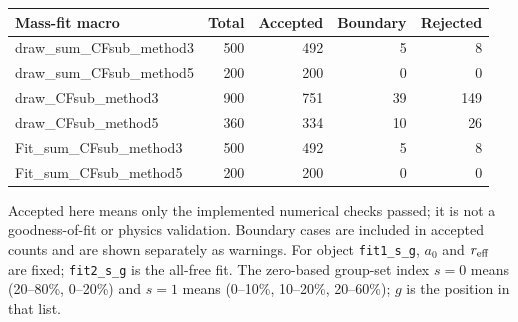 \documentclass[11pt,a4paper]{article}
\begin{document}
{\small\begin{longtable}{lrrrr}\hline Mass-fit macro & Total & Accepted & Boundary & Rejected\\\hline\endhead
draw\_sum\_CFsub\_method3 & 500 & 492 & 5 & 8\\
draw\_sum\_CFsub\_method5 & 200 & 200 & 0 & 0\\
draw\_CFsub\_method3 & 900 & 751 & 39 & 149\\
draw\_CFsub\_method5 & 360 & 334 & 10 & 26\\
Fit\_sum\_CFsub\_method3 & 500 & 492 & 5 & 8\\
Fit\_sum\_CFsub\_method5 & 200 & 200 & 0 & 0\\
\hline\end{longtable}}
Accepted here means only the implemented numerical checks passed; it is not a goodness-of-fit or physics validation. Boundary cases are included in accepted counts and are shown separately as warnings.
For object \texttt{fit1\_s\_g}, $a_0$ and $r_{\rm eff}$ are fixed; \texttt{fit2\_s\_g} is the all-free fit. The zero-based group-set index $s=0$ means (20--80\%, 0--20\%) and $s=1$ means (0--10\%, 10--20\%, 20--60\%); $g$ is the position in that list.
\end{document}
